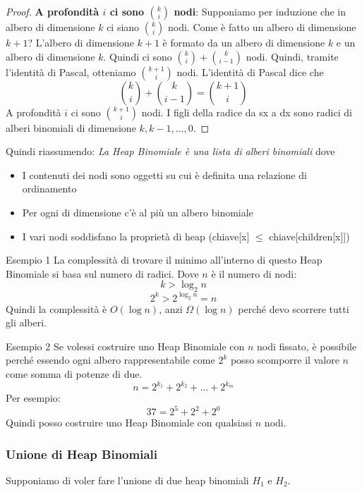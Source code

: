 \documentclass[a4paper]{article}
\begin{document}
\begin{proof}
  \textbf{A profondità $i$ ci sono $\binom{k}{i}$ nodi}: 
  Supponiamo per induzione che in albero di dimensione $k$ ci siano $\binom{k}{i}$ nodi.
  Come è fatto un albero di dimensione $k+1$?
  \noindent
  L'albero di dimensione $k+1$ è formato da un albero di dimensione $k$ e un albero di dimensione $k$.
  Quindi ci sono $\binom{k}{i} + \binom{k}{i-1}$ nodi.
  Quindi, tramite l'identità di Pascal, otteniamo $\binom{k+1}{i}$ nodi.
  L'identità di Pascal dice che \[\binom{k}{i} + \binom{k}{i-1} = \binom{k+1}{i}\]
  A profondità $i$ ci sono $\binom{k+1}{i}$ nodi.
  I figli della radice da sx a dx sono radici di alberi binomiali di dimensione $k, k-1, \dots, 0$.
\end{proof}
\noindent
Quindi riassumendo: \textit{La Heap Binomiale è una lista di alberi binomiali} dove
\begin{itemize}
  \item I contenuti dei nodi sono oggetti su cui è definita una relazione di ordinamento
  \item Per ogni di dimensione c'è al più un albero binomiale
  \item I vari nodi soddisfano la proprietà di heap (chiave[x] $\leq$ chiave[children[x]])
\end{itemize}
\begin{examplebox}{Esempio 1}
  La complessità di trovare il minimo all'interno di questo Heap Binomiale si basa sul numero di radici. Dove $n$ è il numero di nodi:
  \[k > \log_2 n\]
  \[2^k > 2^{\log_2 n} = n\]
  Quindi la complessità è $O(\log n)$, anzi $\Omega(\log n)$ perché devo scorrere tutti gli alberi.
\end{examplebox}

\begin{examplebox}{Esempio 2}
  Se volessi costruire uno Heap Binomiale con $n$ nodi fissato, è possibile perché essendo ogni albero rappresentabile come $2^k$ 
  posso scomporre il valore $n$ come somma di potenze di due.
  \[n = 2^{k_1} + 2^{k_2} + \dots + 2^{k_m}\]
  Per esempio:
  \[37 = 2^5 + 2^2 + 2^0\]
  Quindi posso costruire uno Heap Binomiale con qualsiasi $n$ nodi.
\end{examplebox}

\subsubsection{Unione di Heap Binomiali}

Supponiamo di voler fare l'unione di due heap binomiali $H_1$ e $H_2$. 
\end{document}
